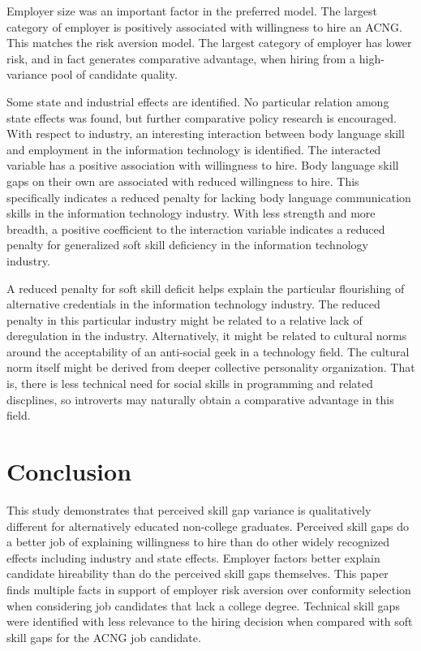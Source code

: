 \documentclass[review]{elsarticle}
\begin{document}
Employer size was an important factor in the preferred model.
The largest category of employer is positively associated with willingness to hire an ACNG.
This matches the risk aversion model.
The largest category of employer has lower risk, and in fact generates comparative advantage, when hiring from a high-variance pool of candidate quality.

Some state and industrial effects are identified.
No particular relation among state effects was found, but further comparative policy research is encouraged.
With respect to industry, an interesting interaction between body language skill and employment in the information technology is identified.
The interacted variable has a positive association with willingness to hire.
Body language skill gaps on their own are associated with reduced willingness to hire.
This specifically indicates a reduced penalty for lacking body language communication skills in the information technology industry.
With less strength and more breadth, a positive coefficient to the interaction variable indicates a reduced penalty for generalized soft skill deficiency in the information technology industry.

A reduced penalty for soft skill deficit helps explain the particular flourishing of alternative credentials in the information technology industry.
The reduced penalty in this particular industry might be related to a relative lack of deregulation in the industry.
Alternatively, it might be related to cultural norms around the acceptability of an anti-social geek in a technology field.
The cultural norm itself might be derived from deeper collective personality organization.
That is, there is less technical need for social skills in programming and related discplines, so introverts may naturally obtain a comparative advantage in this field.

\section{Conclusion}

This study demonstrates that perceived skill gap variance is qualitatively different for alternatively educated non-college graduates.
Perceived skill gaps do a better job of explaining willingness to hire than do other widely recognized effects including industry and state effects.
Employer factors better explain candidate hireability than do the perceived skill gaps themselves.
This paper finds multiple facts in support of employer risk aversion over conformity selection when considering job candidates that lack a college degree.
Technical skill gaps were identified with less relevance to the hiring decision when compared with soft skill gaps for the ACNG job candidate.
\end{document}
